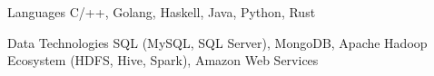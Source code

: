 


\begin{cvskills}


  \cvskill
  {Languages} %
  {C/++, Golang, Haskell, Java, Python, Rust} %

  \cvskill
  {Data Technologies}
  {SQL (MySQL, SQL Server), MongoDB, Apache Hadoop Ecosystem (HDFS, Hive, Spark), Amazon Web Services} %
  
\end{cvskills}
